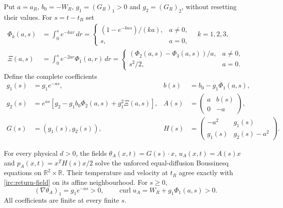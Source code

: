 Put $a=a_R$, $b_0=-W_R$, $g_1=(G_R)_1>0$ and
$g_2=(G_R)_2$, without resetting their values.  For $s=t-t_R$ set
\begin{align}
 \Phi_k(a,s)&=\int_0^s e^{-ka r}\,dr
 =\begin{cases}(1-e^{-ka s})/(ka),&a\ne0,\\s,&a=0,\end{cases}
 \quad k=1,2,3,\nonumber\\
 \Xi(a,s)&=\int_0^s e^{-2ar}\Phi_1(a,r)\,dr
 =\begin{cases}(\Phi_2(a,s)-\Phi_3(a,s))/a,&a\ne0,\\
 s^2/2,&a=0.\end{cases}
 \label{irc:affine-integrals}
\end{align}
Define the complete coefficients
\begin{equation}\label{irc:affine-solution}
 \begin{aligned}
 g_1(s)&=g_1e^{-as},&
 b(s)&=b_0-g_1\Phi_1(a,s),\\
 g_2(s)&=e^{as}\left[g_2-g_1b_0\Phi_2(a,s)
                              +g_1^2\Xi(a,s)\right],&
 A(s)&=\begin{pmatrix}a&b(s)\\0&-a\end{pmatrix},\\
 G(s)&=(g_1(s),g_2(s)),&
 H(s)&=\begin{pmatrix}-a^2&g_1(s)\\g_1(s)&g_2(s)-a^2\end{pmatrix}.
 \end{aligned}
\end{equation}

\begin{theorem}\label{irc:affine-continuation}
For every physical $d>0$, the fields
$\theta_A(x,t)=G(s)\cdot x$, $u_A(x,t)=A(s)x$ and
$p_A(x,t)=x^TH(s)x/2$ solve the unforced equal-diffusion
Boussinesq equations on $\mathbb R^2\times\mathbb R$.
Their temperature and velocity at $t_R$ agree exactly with
\eqref{irc:return-field} on its affine neighbourhood.
For $s\geq0$,
\[
 (\nabla\theta_A)_1=g_1e^{-as}>0,\qquad
 \operatorname{curl}u_A=W_R+g_1\Phi_1(a,s)>0.
\]
All coefficients are finite at every finite $s$.
\end{theorem}


